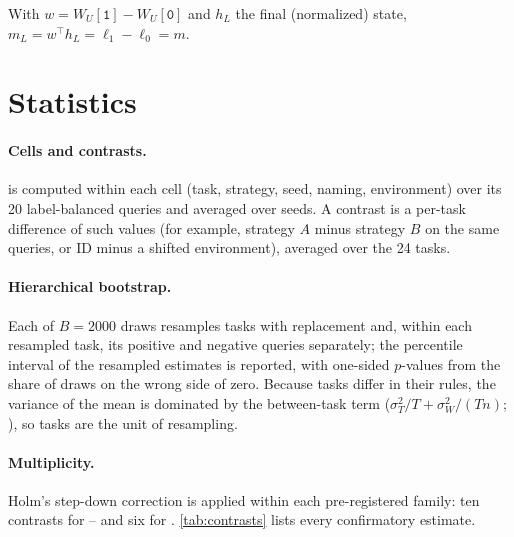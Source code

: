 \begin{lemma}
With $w = W_U[\texttt{1}] - W_U[\texttt{0}]$ and $h_L$ the final (normalized) state, $m_L = w^\top h_L = \ell_1 - \ell_0 = m$.
\end{lemma}

\section{Statistics}

\paragraph{Cells and contrasts.}
\AUROC is computed within each cell (task, strategy, seed, naming, environment) over its 20 label-balanced queries and averaged over seeds.
A contrast is a per-task difference of such values (for example, strategy $A$ minus strategy $B$ on the same queries, or ID minus a shifted environment), averaged over the 24 tasks.

\paragraph{Hierarchical bootstrap.}
Each of $B = 2000$ draws resamples tasks with replacement and, within each resampled task, its positive and negative queries separately; the percentile interval of the resampled estimates is reported, with one-sided $p$-values from the share of draws on the wrong side of zero.
Because tasks differ in their rules, the variance of the mean is dominated by the between-task term ($\sigma_T^2/T + \sigma_W^2/(Tn)$; \citealp{cochran1977sampling}), so tasks are the unit of resampling.

\paragraph{Multiplicity.}
Holm's step-down correction \citep{holm1979simple} is applied within each pre-registered family: ten contrasts for -- and six for \sata.
\autoref{tab:contrasts} lists every confirmatory estimate.

